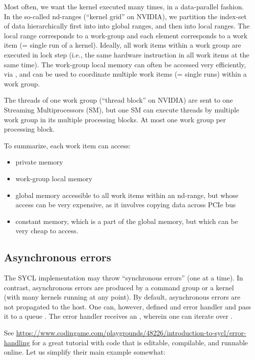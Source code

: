 Most often, we want the kernel executed many times, in a data-parallel fashion. 
In the so-called nd-ranges (``kernel grid'' on NVIDIA), we partition the index-set of data hierarchically first into into global ranges, and then into local ranges. 
The local range corresponds to a work-group and each element corresponds to a work item (= single run of a kernel). 
Ideally, all work items within a work group are executed in lock step (i.e., the same hardware instruction in all work items at the same time).
The work-group local memory can often be accessed very efficiently, via , and can be used to coordinate multiple work items (= single runs) within a work group.

The threads of one work group (``thread block'' on NVIDIA) are sent to one Streaming Multiprocessors (SM), but one SM can execute threads by multiple work group in its multiple processing blocks. At most one work group per processing block.

To summarize, each work item can access:
\begin{itemize}
\item private memory
\item work-group local memory
\item global memory accessible to all work items within an nd-range, but whose access can be very expensive, as it involves copying data across PCIe bus
\item constant memory, which is a part of the global memory, but which can be very cheap to access. 
\end{itemize}

\subsection{Asynchronous errors}

The SYCL implementation may throw ``synchronous errors'' (one at a time).
In contrast, asynchronous errors are produced by a command group or a kernel (with many kernels running at any point). By default, asynchronous errors are not propagated to the host. One can, however, defined and error handler and pass it to a queue .
The error handler receives an , wherein one can iterate over .

See \url{https://www.codingame.com/playgrounds/48226/introduction-to-sycl/error-handling} for a great tutorial with code that is editable, compilable, and runnable online. Let us simplify their main example somewhat:

